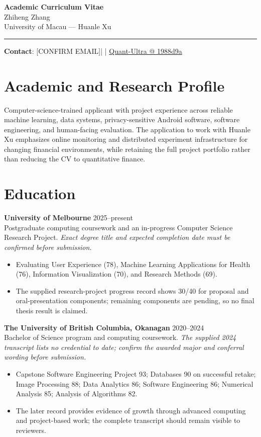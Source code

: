 \documentclass[11pt]{article}
\makeatletter
\newcommand{\ApplicantName}{Zhiheng Zhang}
\newcommand{\ApplicantEmail}{[CONFIRM EMAIL]}
\newcommand{\ApplicantPhone}{[CONFIRM PHONE]}
\newcommand{\ApplicantGitHub}{\href{https://github.com/zhiheng-zhang-Mera/Quant-Ultra/tree/1988d9a8530da91a8158de864d098ea869098923}{Quant-Ultra @ 1988d9a}}
\makeatother
\begin{document}
\begin{center}
{\LARGE\bfseries Academic Curriculum Vitae}\\[0.25em]
{\large \ApplicantName}\\
University of Macau --- Huanle Xu
\end{center}
\vspace{0.35em}\hrule\vspace{0.65em}

\textbf{Contact}: \ApplicantEmail\quad | \quad \ApplicantPhone\quad | \quad \ApplicantGitHub

\section*{Academic and Research Profile}
Computer-science-trained applicant with project experience across reliable machine learning, data systems, privacy-sensitive Android software, software engineering, and human-facing evaluation. The application to work with Huanle Xu emphasizes online monitoring and distributed experiment infrastructure for changing financial environments, while retaining the full project portfolio rather than reducing the CV to quantitative finance.

\section*{Education}
\textbf{University of Melbourne} \hfill 2025--present\\
Postgraduate computing coursework and an in-progress Computer Science Research Project. \textit{Exact degree title and expected completion date must be confirmed before submission.}
\begin{itemize}
\item Evaluating User Experience (78), Machine Learning Applications for Health (76), Information Visualization (70), and Research Methods (69).
\item The supplied research-project progress record shows 30/40 for proposal and oral-presentation components; remaining components are pending, so no final thesis result is claimed.
\end{itemize}

\textbf{The University of British Columbia, Okanagan} \hfill 2020--2024\\
Bachelor of Science program and computing coursework. \textit{The supplied 2024 transcript lists no credential to date; confirm the awarded major and conferral wording before submission.}
\begin{itemize}
\item Capstone Software Engineering Project 93; Databases 90 on successful retake; Image Processing 88; Data Analytics 86; Software Engineering 86; Numerical Analysis 85; Analysis of Algorithms 82.
\item The later record provides evidence of growth through advanced computing and project-based work; the complete transcript should remain visible to reviewers.
\end{itemize}
\end{document}

